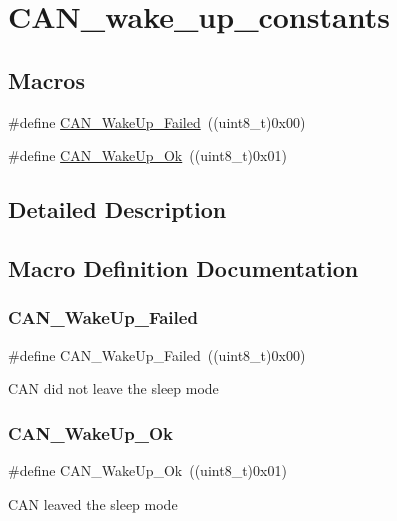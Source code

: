 \hypertarget{group___c_a_n__wake__up__constants}{}\section{C\+A\+N\+\_\+wake\+\_\+up\+\_\+constants}
\label{group___c_a_n__wake__up__constants}
\subsection*{Macros}
\begin{DoxyCompactItemize}
\item 
\#define \mbox{\hyperlink{group___c_a_n__wake__up__constants_ga837fd7ad47fee78e43a186544e2b390b}{C\+A\+N\+\_\+\+Wake\+Up\+\_\+\+Failed}}~((uint8\+\_\+t)0x00)
\item 
\#define \mbox{\hyperlink{group___c_a_n__wake__up__constants_ga152e4935cf85bdfb803eb36b656cd690}{C\+A\+N\+\_\+\+Wake\+Up\+\_\+\+Ok}}~((uint8\+\_\+t)0x01)
\end{DoxyCompactItemize}


\subsection{Detailed Description}


\subsection{Macro Definition Documentation}
\mbox{\label{group___c_a_n__wake__up__constants_ga837fd7ad47fee78e43a186544e2b390b}} 
\subsubsection{\texorpdfstring{CAN\_WakeUp\_Failed}{CAN\_WakeUp\_Failed}}
{\footnotesize\ttfamily \#define C\+A\+N\+\_\+\+Wake\+Up\+\_\+\+Failed~((uint8\+\_\+t)0x00)}

C\+AN did not leave the sleep mode \mbox{\label{group___c_a_n__wake__up__constants_ga152e4935cf85bdfb803eb36b656cd690}} 
\subsubsection{\texorpdfstring{CAN\_WakeUp\_Ok}{CAN\_WakeUp\_Ok}}
{\footnotesize\ttfamily \#define C\+A\+N\+\_\+\+Wake\+Up\+\_\+\+Ok~((uint8\+\_\+t)0x01)}

C\+AN leaved the sleep mode 
